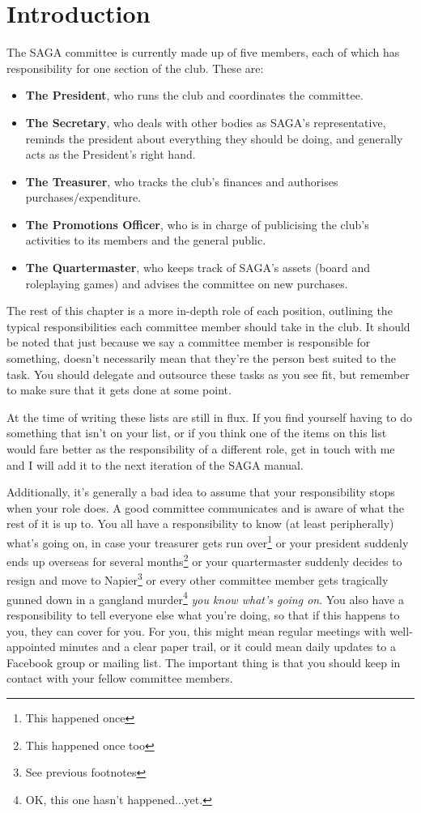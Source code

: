 \section{Introduction}

The SAGA committee is currently made up of five members, each of which has responsibility for one section of the club. These are:

\begin{itemize}
  \item \textbf{The President}, who runs the club and coordinates the committee.
  \item \textbf{The Secretary}, who deals with other bodies as SAGA's representative, reminds the president about everything they should be doing, and generally acts as the President's right hand.
  \item \textbf{The Treasurer}, who tracks the club's finances and authorises purchases/expenditure.
  \item \textbf{The Promotions Officer}, who is in charge of publicising the club's activities to its members and the general public.
  \item \textbf{The Quartermaster}, who keeps track of SAGA's assets (board and roleplaying games) and advises the committee on new purchases.
\end{itemize}

The rest of this chapter is a more in-depth role of each position, outlining the typical responsibilities each committee member should take in the club. It should be noted that just because we say a committee member is responsible for something, doesn't necessarily mean that they're the person best suited to the task. You should delegate and outsource these tasks as you see fit, but remember to make sure that it gets done at some point.

At the time of writing these lists are still in flux. If you find yourself having to do something that isn't on your list, or if you think one of the items on this list would fare better as the responsibility of a different role, get in touch with me and I will add it to the next iteration of the SAGA manual.

Additionally, it's generally a bad idea to assume that your responsibility stops when your role does. A good committee communicates and is aware of what the rest of it is up to. You all have a responsibility to know (at least peripherally) what's going on, in case your treasurer gets run over\footnote{This happened once} or your president suddenly ends up overseas for several months\footnote{This happened once too} or your quartermaster suddenly decides to resign and move to Napier\footnote{See previous footnotes} or every other committee member gets tragically gunned down in a gangland murder\footnote{OK, this one hasn't happened...yet.} \textit{you know what's going on}. You also have a responsibility to tell everyone else what you're doing, so that if this happens to you, they can cover for you. For you, this might mean regular meetings with well-appointed minutes and a clear paper trail, or it could mean daily updates to a Facebook group or mailing list. The important thing is that you should keep in contact with your fellow committee members.

